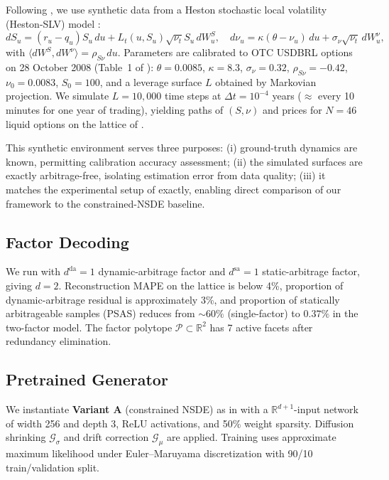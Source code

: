 \documentclass{article}
\newcommand{\R}{\mathbb{R}}
\newcommand{\1}{\mathbf{1}}
\newcommand{\cP}{\mathcal{P}}
\newcommand{\cG}{\mathcal{G}}
\begin{document}
Following \citet{cohen2021}, we use synthetic data from a Heston stochastic local volatility (Heston-SLV) model \citep{jex1999}:
\begin{equation}
dS_u = (r_u - q_u) S_u\, du + L_t(u, S_u) \sqrt{\nu_t} S_u\, dW^S_u, \quad d\nu_u = \kappa(\theta - \nu_u)\, du + \sigma_\nu \sqrt{\nu_t}\, dW^\nu_u,
\label{eq:hestonslv}
\end{equation}
with $\langle dW^S, dW^\nu \rangle = \rho_{S\nu}\, du$. Parameters are calibrated to OTC USDBRL options on 28 October 2008 (Table~1 of \citet{cohen2021}): $\theta = 0.0085$, $\kappa = 8.3$, $\sigma_\nu = 0.32$, $\rho_{S\nu} = -0.42$, $\nu_0 = 0.0083$, $S_0 = 100$, and a leverage surface $L$ obtained by Markovian projection. We simulate $L = 10{,}000$ time steps at $\Delta t = 10^{-4}$ years (\(\approx\) every 10 minutes for one year of trading), yielding paths of $(S, \nu)$ and prices for $N = 46$ liquid options on the lattice of \citet[Figure 3]{cohen2021}.

This synthetic environment serves three purposes: (i) ground-truth dynamics are known, permitting calibration accuracy assessment; (ii) the simulated surfaces are exactly arbitrage-free, isolating estimation error from data quality; (iii) it matches the experimental setup of \citet{cohen2021} exactly, enabling direct comparison of our framework to the constrained-NSDE baseline.

\subsection{Factor Decoding}

We run \citet[Algorithm 1]{cohen2021} with $d^{\mathrm{da}} = 1$ dynamic-arbitrage factor and $d^{\mathrm{sa}} = 1$ static-arbitrage factor, giving $d = 2$. Reconstruction MAPE on the lattice is below 4\%, proportion of dynamic-arbitrage residual is approximately 3\%, and proportion of statically arbitrageable samples (PSAS) reduces from $\sim 60\%$ (single-factor) to $0.37\%$ in the two-factor model. The factor polytope $\cP \subset \R^2$ has 7 active facets after redundancy elimination.

\subsection{Pretrained Generator}

We instantiate \textbf{Variant A} (constrained NSDE) as in \citet[\S 4.4]{cohen2021} with a $\R^{d+1}$-input network of width 256 and depth 3, ReLU activations, and 50\% weight sparsity. Diffusion shrinking $\cG_\sigma$ and drift correction $\cG_\mu$ are applied. Training uses approximate maximum likelihood under Euler--Maruyama discretization with 90/10 train/validation split.
\end{document}
